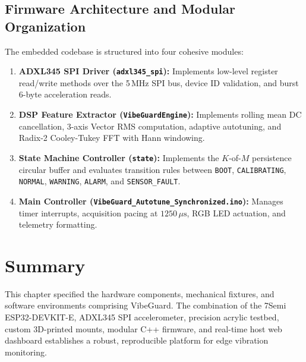\subsection{Firmware Architecture and Modular Organization}
The embedded codebase is structured into four cohesive modules:
\begin{enumerate}
    \item \textbf{ADXL345 SPI Driver (\texttt{adxl345\_spi}):} Implements low-level register read/write methods over the 5\,MHz SPI bus, device ID validation, and burst 6-byte acceleration reads.
    \item \textbf{DSP Feature Extractor (\texttt{VibeGuardEngine}):} Implements rolling mean DC cancellation, 3-axis Vector RMS computation, adaptive autotuning, and Radix-2 Cooley-Tukey FFT with Hann windowing.
    \item \textbf{State Machine Controller (\texttt{state}):} Implements the $K$-of-$M$ persistence circular buffer and evaluates transition rules between \texttt{BOOT}, \texttt{CALIBRATING}, \texttt{NORMAL}, \texttt{WARNING}, \texttt{ALARM}, and \texttt{SENSOR\_FAULT}.
    \item \textbf{Main Controller (\texttt{VibeGuard\_Autotune\_Synchronized.ino}):} Manages timer interrupts, acquisition pacing at $1250\,\mu\text{s}$, RGB LED actuation, and telemetry formatting.
\end{enumerate}

\section{Summary}
\hspace{2em}This chapter specified the hardware components, mechanical fixtures, and software environments comprising VibeGuard. The combination of the 7Semi ESP32-DEVKIT-E, ADXL345 SPI accelerometer, precision acrylic testbed, custom 3D-printed mounts, modular C++ firmware, and real-time host web dashboard establishes a robust, reproducible platform for edge vibration monitoring.
\clearpage
